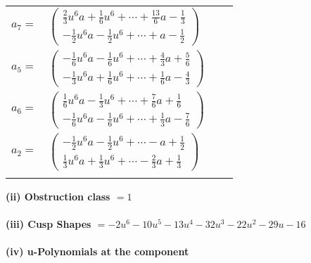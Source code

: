\documentclass[1p]{elsarticle_modified}
\theoremstyle{definition}
\begin{document}
\begin{tabular}{m{7pt} m{180pt} m{7pt} m{180pt} }
\flushright $a_{7}=$&$\begin{pmatrix}\frac{2}{3} u^6 a+\frac{1}{6} u^6+\cdots+\frac{13}{6} a-\frac{1}{3}\\-\frac{1}{2} u^6 a-\frac{1}{2} u^6+\cdots+a-\frac{1}{2}\end{pmatrix}$ \\
\flushright $a_{5}=$&$\begin{pmatrix}-\frac{1}{6} u^6 a-\frac{1}{6} u^6+\cdots+\frac{4}{3} a+\frac{5}{6}\\-\frac{1}{3} u^6 a+\frac{1}{6} u^6+\cdots+\frac{1}{6} a-\frac{4}{3}\end{pmatrix}$ \\
\flushright $a_{6}=$&$\begin{pmatrix}\frac{1}{6} u^6 a-\frac{1}{3} u^6+\cdots+\frac{7}{6} a+\frac{1}{6}\\-\frac{1}{6} u^6 a-\frac{1}{6} u^6+\cdots+\frac{1}{3} a-\frac{7}{6}\end{pmatrix}$ \\
\flushright $a_{2}=$&$\begin{pmatrix}-\frac{1}{2} u^6 a-\frac{1}{2} u^6+\cdots- a+\frac{1}{2}\\\frac{1}{3} u^6 a+\frac{1}{3} u^6+\cdots-\frac{2}{3} a+\frac{1}{3}\end{pmatrix}$\\&\end{tabular}
\flushleft \textbf{(ii) Obstruction class $= 1$}\\~\\
\flushleft \textbf{(iii) Cusp Shapes $= -2 u^6-10 u^5-13 u^4-32 u^3-22 u^2-29 u-16$}\\~\\
\newpage\renewcommand{\arraystretch}{1}
\flushleft \textbf{(iv) u-Polynomials at the component}\newline \\
\end{document}
